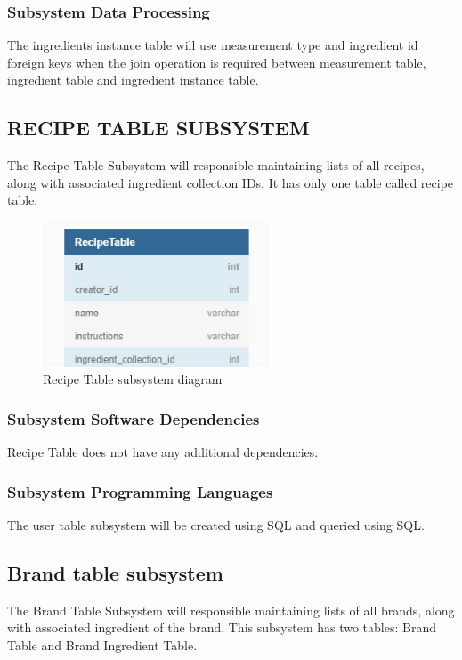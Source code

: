 \subsubsection{Subsystem Data Processing}
The ingredients instance table will use measurement type and ingredient id foreign keys when the join operation is required between measurement table, ingredient table and ingredient instance table.

\subsection{RECIPE TABLE SUBSYSTEM }
The Recipe Table Subsystem will responsible maintaining lists of all recipes, along with associated ingredient collection IDs. It has only one table called recipe table.

\begin{figure}[h!]
	\centering
 	\includegraphics[width=0.60\textwidth]{images/Recepice_Subsystem.png}
 \caption{Recipe Table subsystem diagram}
\end{figure}

\subsubsection{Subsystem Software Dependencies}
Recipe Table does not have any additional dependencies.

\subsubsection{Subsystem Programming Languages}
The user table subsystem will be created using SQL and queried using SQL.


\subsection{Brand table subsystem }
The Brand Table Subsystem will responsible maintaining lists of all brands, along with associated ingredient of the brand. This subsystem has two tables: Brand Table and Brand Ingredient Table.

